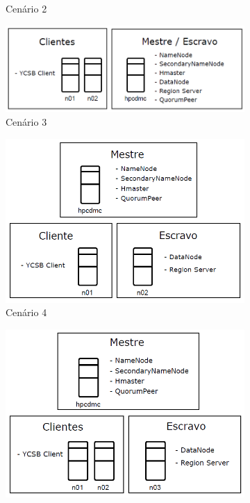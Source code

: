 \documentclass[12pt]{article}
\begin{document}
\begin{figure}
\begin{subfigure}{0.3\textwidth}
        \caption{Cenário 2}%
        \label{figura2b}
    \end{subfigure}
    \hspace{0.4cm}
    \begin{subfigure}{0.3\textwidth}
    	\centering
        \includegraphics[width=1.1\textwidth]{images/cenario-3.png}
        \caption{Cenário 3}
        \label{figura2c}
    \end{subfigure}
    \medskip
    \begin{subfigure}{0.3\textwidth}   
    	\centering
        \includegraphics[width=1.0\textwidth]{images/cenario-4.png}
        \caption{Cenário 4}%
        \label{figura2d}
    \end{subfigure}
    \begin{subfigure}{0.3\textwidth}
    	\centering
        \includegraphics[width=1.0\textwidth]{images/cenario-5.png}

\end{subfigure}
\end{figure}
\end{document}
